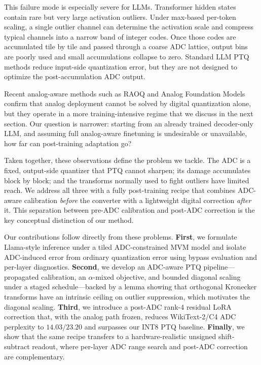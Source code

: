 \documentclass[letterpaper]{article} %
\theoremstyle{plain}
\begin{document}
    This failure mode is especially severe for LLMs. Transformer hidden states contain rare but very large activation outliers. Under max-based per-token scaling, a single outlier channel can determine the activation scale and compress typical channels into a narrow band of integer codes. Once those codes are accumulated tile by tile and passed through a coarse ADC lattice, output bins are poorly used and small accumulations collapse to zero. Standard LLM PTQ methods reduce input-side quantization error, but they are not designed to optimize the post-accumulation ADC output.
    
    Recent analog-aware methods such as RAOQ and Analog Foundation Models confirm that analog deployment cannot be solved by digital quantization alone, but they operate in a more training-intensive regime that we discuss in the next section. Our question is narrower: starting from an already trained decoder-only LLM, and assuming full analog-aware finetuning is undesirable or unavailable, how far can post-training adaptation go?
    
    Taken together, these observations define the problem we tackle. The ADC is a fixed, output-side quantizer that PTQ cannot sharpen; its damage accumulates block by block; and the transforms normally used to fight outliers have limited reach. We address all three with a fully post-training recipe that combines ADC-aware calibration \emph{before} the converter with a lightweight digital correction \emph{after} it. This separation between pre-ADC calibration and post-ADC correction is the key conceptual distinction of our method.

    Our contributions follow directly from these problems. \textbf{First}, we formulate Llama-style inference under a tiled ADC-constrained MVM model and isolate ADC-induced error from ordinary quantization error using bypass evaluation and per-layer diagnostics. \textbf{Second}, we develop an ADC-aware PTQ pipeline---propagated calibration, an $\alpha$-mixed objective, and bounded diagonal scaling under a staged schedule---backed by a lemma showing that orthogonal Kronecker transforms have an intrinsic ceiling on outlier suppression, which motivates the diagonal scaling. \textbf{Third}, we introduce a post-ADC rank-4 residual LoRA correction that, with the analog path frozen, reduces WikiText-2/C4 ADC perplexity to $14.03/23.20$ and surpasses our INT8 PTQ baseline. \textbf{Finally}, we show that the same recipe transfers to a hardware-realistic unsigned shift-subtract readout, where per-layer ADC range search and post-ADC correction are complementary.
    
\end{document}
